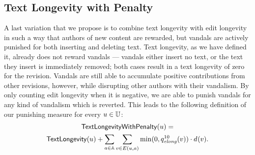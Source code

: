\subsection{Text Longevity with Penalty}

\noindent
A last variation that we propose is to combine text longevity with 
edit longevity in such a way that authors of new content are rewarded, 
but vandals are actively punished for both inserting and deleting text.
Text longevity, as we have defined it, already does not
reward vandals --- vandals either insert no text, or the
text they insert is immediately removed; both cases result
in a text longevity of zero for the revision.
Vandals are still able to accumulate positive contributions
from other revisions, however, while disrupting other
authors with their vandalism.
By only counting edit longevity when it is negative,
we are able to punish vandals for any kind of vandalism
which is reverted.
This leads to the following definition of our punishing 
measure for every $u \in \mathbb{U}$:
%
\begin{gather*}
\punish(u) = \\
\textlong(u) +
\sum_{a \in \articles} \sum_{v \in E(u, a)} \min(0, \quality{elong}{10}{v}) \cdot \dist{}{v}.
\end{gather*}
%

